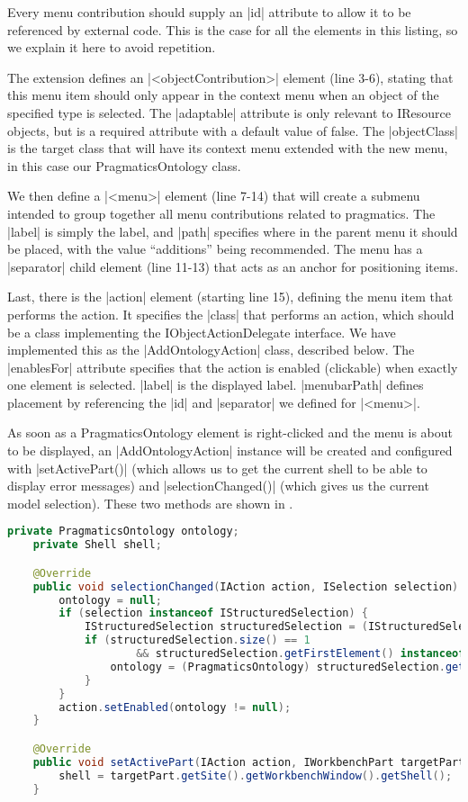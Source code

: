 Every menu contribution should supply an |id| attribute to allow it to be
referenced by external code. This is the case for all the elements in this
listing, so we explain it here to avoid repetition.

The extension defines an
|<objectContribution>| element (line 3-6), stating that this menu item should
only appear in the context menu when an object of the specified type is selected. The
|adaptable| attribute is only relevant to IResource objects, but is a required
attribute with a default value of false. The |objectClass| is the
target class that will have its context menu extended with the new menu, in this
case our PragmaticsOntology class.

We then define a |<menu>| element (line 7-14) that will create a submenu
intended to group together all menu contributions related to pragmatics. The
|label| is simply the label, and |path| specifies where in the parent menu it
should be placed, with the value ``additions'' being recommended. The menu has
a |separator| child element (line 11-13) that acts as an anchor for positioning
items.

Last, there is the |action| element (starting line 15), defining the menu item
that performs the action. It specifies the |class| that performs an action, which should be a
class implementing the IObjectActionDelegate interface. We have implemented this
as the |AddOntologyAction| class, described below. The |enablesFor| attribute
specifies that the action is enabled (clickable) when exactly one element is
selected. |label| is the displayed label. |menubarPath| defines
placement by referencing the |id| and |separator| we defined for |<menu>|.

As soon as a PragmaticsOntology element is right-clicked and the menu is about
to be displayed, an |AddOntologyAction| instance will be created and configured
with |setActivePart()| (which allows us to get the current shell to be able to display error messages)
and |selectionChanged()| (which gives us the current model selection). These two
methods are shown in .


\begin{lstlisting}[language=Java,float,label=lst:AddOntologyAction_config,
caption=AddOntologyAction setActivePart() and selectionChanged()]
	private PragmaticsOntology ontology;
	private Shell shell;

	@Override
	public void selectionChanged(IAction action, ISelection selection) {
		ontology = null;
		if (selection instanceof IStructuredSelection) {
			IStructuredSelection structuredSelection = (IStructuredSelection) selection;
			if (structuredSelection.size() == 1
					&& structuredSelection.getFirstElement() instanceof PragmaticsOntology) {
				ontology = (PragmaticsOntology) structuredSelection.getFirstElement();
			}
		}
		action.setEnabled(ontology != null);
	}

	@Override
	public void setActivePart(IAction action, IWorkbenchPart targetPart) {
		shell = targetPart.getSite().getWorkbenchWindow().getShell();
	}
\end{lstlisting}


